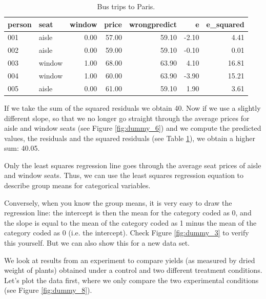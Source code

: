 \documentclass[]{report}\usepackage[]{graphicx}\usepackage[]{color}
\begin{document}
\begin{table}[ht]
\centering
\caption{Bus trips to Paris.} 
\label{tab:dummy_7}
\begin{tabular}{llrrrrr}
  \hline
person & seat & window & price & wrongpredict & e & e\_squared \\ 
  \hline
001 & aisle & 0.00 & 57.00 & 59.10 & -2.10 & 4.41 \\ 
  002 & aisle & 0.00 & 59.00 & 59.10 & -0.10 & 0.01 \\ 
  003 & window & 1.00 & 68.00 & 63.90 & 4.10 & 16.81 \\ 
  004 & window & 1.00 & 60.00 & 63.90 & -3.90 & 15.21 \\ 
  005 & aisle & 0.00 & 61.00 & 59.10 & 1.90 & 3.61 \\ 
   \hline
\end{tabular}
\end{table}


If we take the sum of the squared residuals we obtain 40. Now if we use a slightly different slope, so that we no longer go straight through the average prices for aisle and window seats (see Figure \ref{fig:dummy_6}) and we compute the predicted values, the residuals and the squared residuals (see Table \ref{tab:dummy_7}), we obtain a higher sum: 40.05. 

Only the least squares regression line goes through the average seat prices of aisle and window seats. Thus, we can use the least squares regression equation to describe group means for categorical variables. 

Conversely, when you know the group means, it is very easy to draw the regression line: the intercept is then the mean for the category coded as 0, and the slope is equal to the mean of the category coded as 1 minus the mean of the category coded as 0 (i.e. the intercept). Check Figure \ref{fig:dummy_3} to verify this yourself. But we can also show this for a new data set.


We look at results from an experiment to compare yields (as measured by dried weight of plants) obtained under a control and two different treatment conditions. Let's plot the data first, where we only compare the two experimental conditions (see Figure \ref{fig:dummy_8}).
\end{document}
